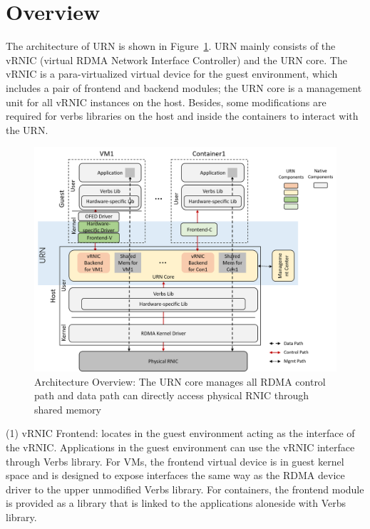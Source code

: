 \section{Overview}
The architecture of URN is shown in Figure~\ref{fig:framework-overview}. URN mainly consists of the vRNIC (virtual RDMA Network Interface Controller) and the URN core. The vRNIC is a para-virtualized virtual device for the guest environment, which includes a pair of frontend and backend modules; the URN core is a management unit for all vRNIC instances on the host. Besides, some modifications are required for  verbs libraries on the host and inside the containers to interact with the URN.

\begin{figure}[!ht]
	\centering
	\includegraphics[width=1\linewidth]{images/framework-overview.png}
	\caption{Architecture Overview: The URN core manages all RDMA control path and data path can directly access physical RNIC through shared memory}
	\label{fig:framework-overview}
\end{figure}

(1) vRNIC Frontend: locates in the guest environment acting as the interface of the vRNIC. Applications in the guest environment can use the vRNIC interface through Verbs library. For VMs, the frontend virtual device is in guest kernel space and is designed to expose interfaces the same way as the RDMA device driver to the upper unmodified Verbs library. For containers, the frontend module is provided as a library that is linked to the applications aloneside with Verbs library.

